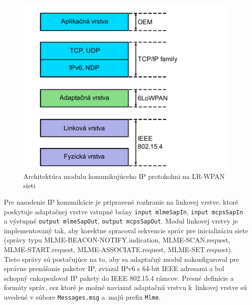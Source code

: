 \begin{figure}[htbp]
\begin{center}
\includegraphics[width=120mm]{figures/ip_ieee}
\caption{Architektúra modulu komunikujúceho IP protokolmi na LR-WPAN sieti}
\label{fig:ip_ieee}
\end{center}
\end{figure}
\indent Pre nasadenie IP komunikácie je pripravené rozhranie na linkovej vrstve, ktoré poskytuje adaptačnej vrstve vstupné brány \texttt{input mlmeSapIn}, \texttt{input mcpsSapIn} a výstupné \texttt{output mlmeSapOut}, \texttt{output mcpsSapOut}. Modul linkovej vrstvy je implementovaný tak, aby korektne spracoval sekvencie správ pre inicializáciu siete (správy typu MLME-BEACON-NOTIFY.indication, MLME-SCAN.request, MLME-START.request, MLME-ASSOCIATE.request, MLME-SET.request). Tieto správy sú postačujúce na to, aby sa adaptačný modul nakonfiguroval pre správne prenášanie paketov IP, zviazal IPv6 s 64-bit IEEE adresami a bol schopný enkapsulovať IP pakety do IEEE 802.15.4 rámcov. Presné definície a formáty správ, cez ktoré je možné naviazať adaptačnú vrstvu k~linkovej vrstve sú uvedené v súbore \texttt{Messages.msg} a~majú prefix \texttt{Mlme}.
